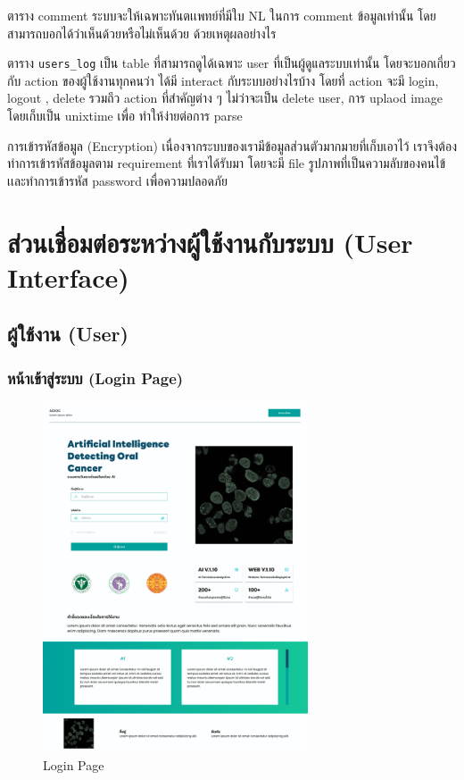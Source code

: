 ตาราง comment ระบบจะให้เฉพาะทันตเเพทย์ที่มีใบ NL ในการ comment ข้อมูลเท่านั้น โดยสามารถบอกได้ว่าเห็นด้วยหรือไม่เห็นด้วย ด้วยเหตุผลอย่างไร

ตาราง \texttt{users\_log} เป็น table ที่สามารถดูได้เฉพาะ user ที่เป็นผู้ดูแลระบบเท่านั้น
โดยจะบอกเกี่ยวกับ action ของผู้ใช้งานทุกคนว่า ได้มี interact กับระบบอย่างไรบ้าง โดยที่ action จะมี login, logout , delete รวมถึว action ที่สำคัญต่าง ๆ ไม่ว่าจะเป็น delete user, การ uplaod image โดยเก็บเป็น unixtime เพื่อ ทำให้ง่ายต่อการ parse

การเข้ารหัสข้อมูล (Encryption) เนื่องจากระบบของเรามีข้อมูลส่วนตัวมากมายที่เก็บเอาไว้ เราจึงต้องทำการเข้ารหัสข้อมูลตาม requirement ที่เราได้รับมา โดยจะมี file รูปภาพที่เป็นความลับของคนไข้เเละทำการเข้ารหัส password เพื่อความปลอดภัย

\section{ส่วนเชื่อมต่อระหว่างผู้ใช้งานกับระบบ (User Interface)}
\subsection{ผู้ใช้งาน (User)}
\subsubsection{หน้าเข้าสู่ระบบ (Login Page)}
\begin{figure}[h]
    \begin{center}
        \includegraphics[width=0.7\textwidth]{img/user/1-login-page.png}
    \end{center}
    \caption[Poem]{Login Page}
    \label{fig:login}
\end{figure}

